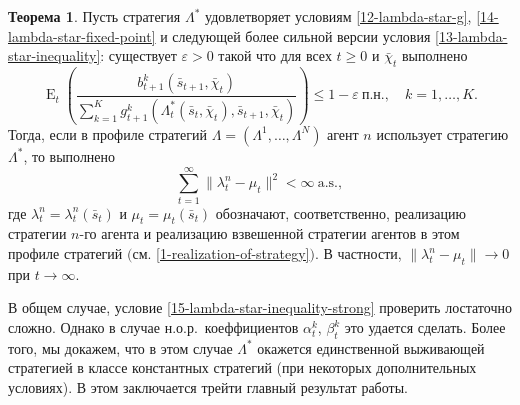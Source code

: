 \documentclass[a4paper,12pt,russian]{article} %
\theoremstyle{definition}
\newtheorem{theorem}{Теорема}
\DeclareMathOperator{\E}{E}
\renewcommand{\epsilon}{\varepsilon}
\begin{document}
\begin{theorem}
\label{theorem2-convergence}
Пусть стратегия $\Lambda^*$ удовлетворяет условиям \eqref{12-lambda-star-g}, \eqref{14-lambda-star-fixed-point} и следующей более сильной версии условия \eqref{13-lambda-star-inequality}: существует $\epsilon>0$ такой что для всех $t\ge 0$ и  $\bar \chi_t$ выполнено
\begin{equation}
\label{15-lambda-star-inequality-strong}
\E_t\left( 
  \frac{b_{t+1}^k (\bar s_{t+1},\bar\chi_t)}
       {\sum_{k=1}^K g_{t+1}^k(\Lambda^*_t(\bar s_{t},\bar\chi_t), \bar s_{t+1},\bar\chi_t)}
  \right) \le 1-\epsilon\ \text{п.н.}, \quad k=1,\dots,K.
\end{equation}
Тогда, если в профиле стратегий $\Lambda=(\Lambda^1,\dots,\Lambda^N)$ агент $n$ использует стратегию $\Lambda^*$, то выполнено
\[
\sum_{t=1}^\infty \|\lambda_t^n - \mu_t\|^2 < \infty\ \text{a.s.},
\]
где $\lambda_t^n = \lambda_t^n(\bar s_t)$ и $\mu_t=\mu_t(\bar s_t)$ обозначают, соответственно, реализацию стратегии $n$-го агента и реализацию взвешенной стратегии агентов в этом профиле стратегий  $($см. \eqref{1-realization-of-strategy}$)$.
В частности, $\|\lambda_t^n - \mu_t\| \to 0$ при $t\to\infty$.
\end{theorem}

В общем случае, условие \eqref{15-lambda-star-inequality-strong} проверить лостаточно сложно.
Однако в случае н.о.р.\ коеффициентов $\alpha_{t}^k$, $\beta_{t}^k$ это удается сделать. Более того, мы докажем, что в этом случае $\Lambda^*$ окажется единственной выживающей стратегией в классе константных стратегий (при некоторых дополнительных условиях).
В этом заключается трейти главный результат работы.
\end{document}
